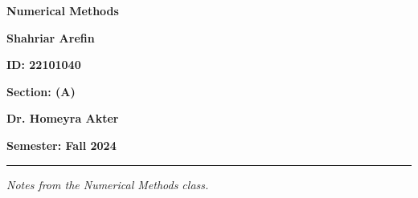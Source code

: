 \begin{titlepage}
   \centering
   \vspace*{1.5cm}
   
   {\Huge {}\par}
   {\Huge\bfseries Numerical Methods\par}
   \vspace{1.5cm}
   
   {\LARGE {}\par}
   {\LARGE\textbf{Shahriar Arefin}\par}
   \vspace{0.5cm}
   {\large\textbf{ID: 22101040}\par}
   \vspace{0.5cm}
   {\large\textbf{Section: (A)}\par}

   \vspace{1cm}
   {\LARGE {}\par}
   {\LARGE\textbf{Dr. Homeyra Akter}\par}
   \vfill

   {\large\textbf{Semester: Fall 2024}\par}
   \vspace{1cm}

   \hrule \vspace{0.2cm}
   {\small \textit{Notes from the Numerical Methods class.}}
\end{titlepage}
